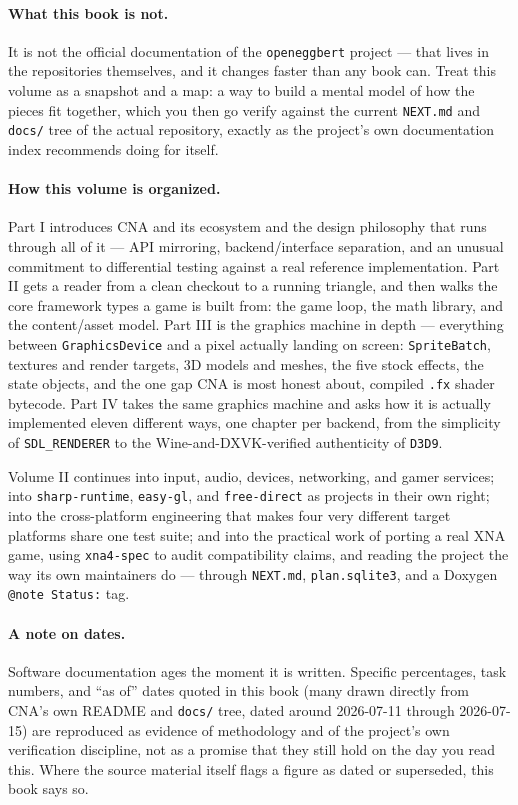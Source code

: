 \paragraph{What this book is not.} It is not the official documentation of the
\texttt{openeggbert} project --- that lives in the repositories themselves, and it changes
faster than any book can. Treat this volume as a snapshot and a map: a way to build a mental
model of how the pieces fit together, which you then go verify against the current
\texttt{NEXT.md} and \texttt{docs/} tree of the actual repository, exactly as the project's
own documentation index recommends doing for itself.

\paragraph{How this volume is organized.} Part I introduces CNA and its ecosystem and the
design philosophy that runs through all of it --- API mirroring, backend/interface
separation, and an unusual commitment to differential testing against a real reference
implementation. Part II gets a reader from a clean checkout to a running triangle, and
then walks the core framework types a game is built from: the game loop, the math library,
and the content/asset model. Part III is the graphics machine in depth --- everything
between \texttt{GraphicsDevice} and a pixel actually landing on screen: \texttt{SpriteBatch},
textures and render targets, 3D models and meshes, the five stock effects, the state
objects, and the one gap CNA is most honest about, compiled \texttt{.fx} shader bytecode.
Part IV takes the same graphics machine and asks how it is actually implemented eleven
different ways, one chapter per backend, from the simplicity of \texttt{SDL\_RENDERER} to
the Wine-and-DXVK-verified authenticity of \texttt{D3D9}.

Volume II continues into input, audio, devices, networking, and gamer services; into
\texttt{sharp-runtime}, \texttt{easy-gl}, and \texttt{free-direct} as projects in their own
right; into the cross-platform engineering that makes four very different target platforms
share one test suite; and into the practical work of porting a real XNA game, using
\texttt{xna4-spec} to audit compatibility claims, and reading the project the way its own
maintainers do --- through \texttt{NEXT.md}, \texttt{plan.sqlite3}, and a Doxygen
\texttt{@note Status:} tag.

\paragraph{A note on dates.} Software documentation ages the moment it is written. Specific
percentages, task numbers, and ``as of'' dates quoted in this book (many drawn directly from
CNA's own README and \texttt{docs/} tree, dated around 2026-07-11 through 2026-07-15) are
reproduced as evidence of methodology and of the project's own verification discipline, not
as a promise that they still hold on the day you read this. Where the source material itself
flags a figure as dated or superseded, this book says so.
